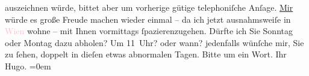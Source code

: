                auszeichnen würde, bittet aber um vorherige gütige telephoniſche Anſage.\pend
           \pstart
           \uline{Mir} würde es große Freude machen wieder einmal – da
               ich jetzt ausnahmsweiſe in \textcolor{pink}{Wien}{}\ledrightnote{\textcolor{pink}{Wien}} wohne – mit Ihnen
               vormittags ſpazierenzugehen.\pend
           \pstart
           Dürfte ich Sie Sonntag oder Montag dazu abholen? Um
                  11 Uhr? oder wann? jedenfalls wünſche mir, Sie zu ſehen, doppelt in
               dieſen etwas abnormalen Tagen. Bitte um ein Wort.\pend
           \pstart
           Ihr{\\[\baselineskip]}\spacefill\mbox{Hugo.}\pend
           \leftskip=0em{}\endnumbering{}  
      